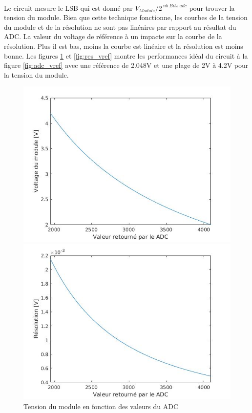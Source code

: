 	\paragraph*{}
	Le circuit mesure le LSB qui est donné par $V_{Module} / 2^{~nb~Bits~adc}$ pour  trouver la tension du module. Bien que cette technique fonctionne, les courbes de la tension du module et de la résolution ne sont pas linéaires par rapport au résultat du ADC. La valeur du voltage de référence à un impacte sur la courbe de la résolution. Plus il est bas, moins la courbe est linéaire et la résolution est moins bonne. Les figures \ref{fig:vmodule_vref} et \ref{fig:res_vref} montre les performances idéal du circuit à la figure \ref{fig:adc_vref} avec une référence de 2.048V et une plage de 2V à 4.2V pour la tension du module.
	
	\begin{figure}[H]
		\begin{minipage}{0.45\textwidth}
			\centering
			\includegraphics[scale=0.4]{Images/Vmodule_REF_2V.jpg}
			\caption{Tension du module en fonction des valeurs du ADC}
			\label{fig:vmodule_vref}
		\end{minipage}
		\hfill
		\begin{minipage}{0.45\textwidth}
			\centering
			\includegraphics[scale=0.4]{Images/RES_REF_2V.jpg}

\end{minipage}
\end{figure}
